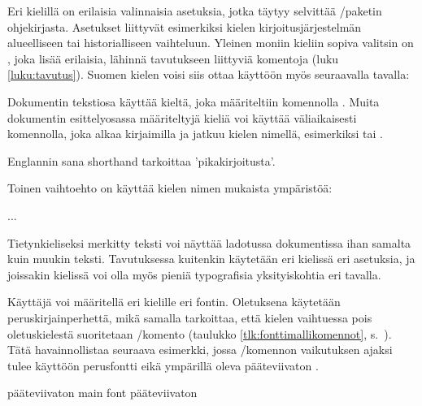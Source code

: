 Eri kielillä on erilaisia valinnaisia asetuksia, jotka täytyy selvittää
\-/paketin ohjekirjasta. Asetukset liittyvät
esimerkiksi kielen kirjoitusjärjestelmän alueelliseen tai
historialliseen vaihteluun. Yleinen moniin kieliin sopiva valitsin on
, joka lisää erilaisia, lähinnä tavutukseen
liittyviä komentoja (luku \ref{luku:tavutus}). Suomen kielen voisi siis
ottaa käyttöön myös seuraavalla tavalla:

\begin{koodilohkosis}
  \setdefaultlanguage[babelshorthands]{finnish}
\end{koodilohkosis}

Dokumentin tekstiosa käyttää kieltä, joka määriteltiin komennolla
. Muita dokumentin esittelyosassa
määriteltyjä kieliä voi käyttää väliaikaisesti komennolla, joka alkaa
kirjaimilla  ja jatkuu kielen nimellä, esimerkiksi
 tai .

\begin{koodilohkosis}
  Englannin sana \textenglish{shorthand} tarkoittaa 'pikakirjoitusta'.
\end{koodilohkosis}

Toinen vaihtoehto on käyttää kielen nimen mukaista ympäristöä:

\begin{koodilohkosis}
  \begin{greek}
    ...
  \end{greek}
\end{koodilohkosis}

Tietynkieliseksi merkitty teksti voi näyttää ladotussa dokumentissa ihan
samalta kuin muukin teksti. Tavutuksessa kuitenkin käytetään eri
kielissä eri asetuksia, ja joissakin kielissä voi olla myös pieniä
typografisia yksityiskohtia eri tavalla.

Käyttäjä voi määritellä eri kielille eri fontin. Oletuksena käytetään
peruskirjainperhettä, mikä samalla tarkoittaa, että kielen vaihtuessa
pois oletuskielestä suoritetaan \-/komento
(taulukko \ref{tlk:fonttimallikomennot},
s.~\pageref{tlk:fonttimallikomennot}). Tätä havainnollistaa seuraava
esimerkki, jossa \-/komennon vaikutuksen
ajaksi tulee käyttöön perusfontti  eikä ympärillä
oleva pääteviivaton .

\begin{koodilohkosis}
  \sffamily
  pääteviivaton \textenglish{main font} pääteviivaton
\end{koodilohkosis}

